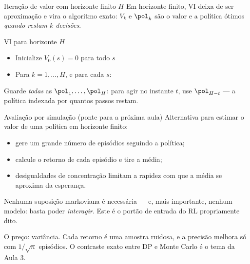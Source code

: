 \documentclass[aspectratio=169, 11pt]{beamer}
\begin{document}
\begin{frame}{Iteração de valor com horizonte finito $H$}
  Em horizonte finito, VI deixa de ser aproximação e vira \alert{o algoritmo exato}:
  $V_k$ e $\pol_k$ são o valor e a política ótimos \emph{quando restam $k$ decisões}.
  \begin{algbox}{VI para horizonte $H$}
    \begin{itemize}\setlength{\itemsep}{0.2ex}
      \item Inicialize $V_0(s) = 0$ para todo $s$
      \item Para $k = 1, \dots, H$, e para cada $s$:
        \begin{center}
        \end{center}
    \end{itemize}
  \end{algbox}
  \vspace{-0.2em}
  \begin{ideiabox}
    Guarde \emph{todas} as $\pol_1, \dots, \pol_H$: para agir no instante $t$, use
    $\pol_{H-t}$ --- a política indexada por \alert{quantos passos restam}.
  \end{ideiabox}
\end{frame}

\begin{frame}{Avaliação por simulação (ponte para a próxima aula)}
  Alternativa para estimar o valor de uma política em horizonte finito:
  \begin{itemize}\setlength{\itemsep}{0.3ex}
    \item gere um grande número de \alert{episódios} seguindo a política;
    \item calcule o retorno de cada episódio e tire a \alert{média};
    \item desigualdades de concentração limitam a rapidez com que a média se aproxima da
          esperança.
  \end{itemize}
  \begin{ideiabox}
    Nenhuma suposição markoviana é necessária --- e, mais importante, nenhum
    \alert{modelo}: basta poder \emph{interagir}. Este é o portão de entrada do RL
    propriamente dito.
  \end{ideiabox}
  \begin{alertabox}
    O preço: variância. Cada retorno é uma amostra ruidosa, e a precisão melhora só com
    $1/\sqrt{n}$ episódios. O contraste exato entre DP e Monte Carlo é o tema da Aula 3.
  \end{alertabox}
\end{frame}
\end{document}
